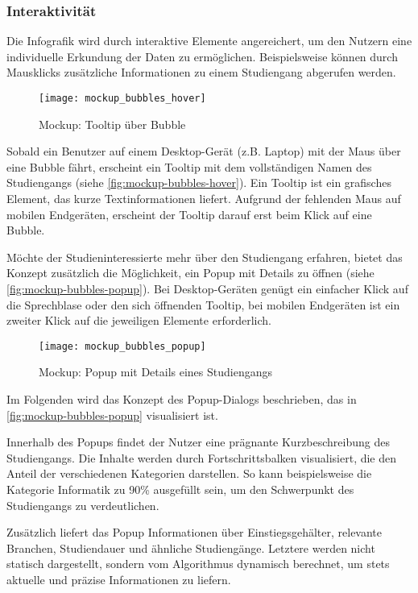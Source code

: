 \subsubsection{Interaktivität}
Die Infografik wird durch interaktive Elemente angereichert, um den Nutzern eine
individuelle Erkundung der Daten zu ermöglichen. Beispielsweise können durch
Mausklicks zusätzliche Informationen zu einem Studiengang abgerufen werden.

\begin{figure}[H]
    \centering
    \texttt{[image: mockup\_bubbles\_hover]}
    \caption{Mockup: Tooltip über Bubble}
    \label{fig:mockup-bubbles-hover}
\end{figure}

Sobald ein Benutzer auf einem Desktop-Gerät (z.B. Laptop) mit der Maus über eine
Bubble fährt, erscheint ein Tooltip mit dem vollständigen Namen des Studiengangs
(siehe \autoref{fig:mockup-bubbles-hover}). Ein Tooltip ist ein grafisches
Element, das kurze Textinformationen liefert. Aufgrund der fehlenden Maus auf
mobilen Endgeräten, erscheint der Tooltip darauf erst beim Klick auf eine
Bubble. 

Möchte der Studieninteressierte mehr über den Studiengang erfahren, bietet das
Konzept zusätzlich die Möglichkeit, ein Popup mit Details zu öffnen (siehe
\autoref{fig:mockup-bubbles-popup}). Bei Desktop-Geräten genügt ein einfacher
Klick auf die Sprechblase oder den sich öffnenden Tooltip, bei mobilen
Endgeräten ist ein zweiter Klick auf die jeweiligen Elemente erforderlich.

\begin{figure}[H]
    \centering
    \texttt{[image: mockup\_bubbles\_popup]}
    \caption{Mockup: Popup mit Details eines Studiengangs}
    \label{fig:mockup-bubbles-popup}
\end{figure}

Im Folgenden wird das Konzept des Popup-Dialogs beschrieben, das in
\autoref{fig:mockup-bubbles-popup} visualisiert ist.

Innerhalb des Popups findet der Nutzer eine prägnante Kurzbeschreibung des 
Studiengangs. Die Inhalte werden durch Fortschrittsbalken visualisiert, die den
Anteil der verschiedenen Kategorien darstellen. So kann beispielsweise die
Kategorie \glqq Informatik\grqq{} zu 90\% ausgefüllt sein, um den Schwerpunkt
des Studiengangs zu verdeutlichen.

Zusätzlich liefert das Popup Informationen über Einstiegsgehälter, relevante
Branchen, Studiendauer und ähnliche Studiengänge. Letztere werden nicht statisch 
dargestellt, sondern vom Algorithmus dynamisch berechnet, um stets aktuelle und
präzise Informationen zu liefern.

